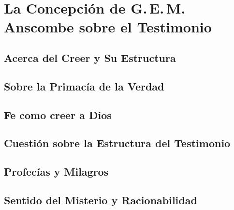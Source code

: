 \documentclass[./main.tex]{subfiles}
\begin{document}



%

%

%

%

\chapter{La Concepción de G.\,E.\,M.\,Anscombe sobre el Testimonio}

\section{Acerca del Creer y Su Estructura}

\section{Sobre la Primacía de la Verdad}

\section{Fe como creer a Dios}

\section{Cuestión sobre la Estructura del Testimonio}

\section{Profecías y Milagros}

\section{Sentido del Misterio y Racionabilidad}
\end{document}
